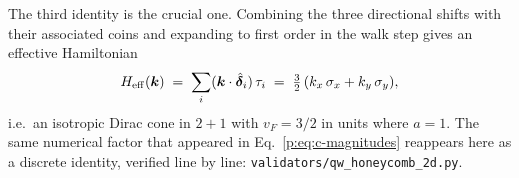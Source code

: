 The third identity is the crucial one. Combining the three directional
shifts with their associated coins and expanding to first order in the
walk step gives an effective Hamiltonian
\begin{equation}
H_{\mathrm{eff}}(\bm{k}) \;=\; \sum_{i}(\bm{k}\cdot\hat{\bm{\delta}}_{i})\,\tau_{i}
\;=\; \tfrac{3}{2}\,(k_x\,\sigma_x + k_y\,\sigma_y),
\label{p:eq:Heff-honeycomb}
\end{equation}
i.e.\ an isotropic Dirac cone in $2{+}1$ with $v_{F}=3/2$ in units where
$a=1$. The same numerical factor that appeared in
Eq.~\eqref{p:eq:c-magnitudes} reappears here as a discrete identity,
verified line by line:
\texttt{validators/qw\_honeycomb\_2d.py}.
